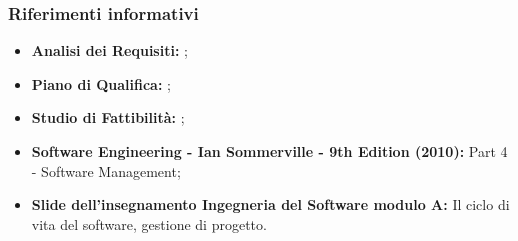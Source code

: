 		\subsubsection{Riferimenti informativi}
			\begin{itemize}
				\item \textbf{Analisi dei Requisiti:} ;
				\item \textbf{Piano di Qualifica:} ;
				\item \textbf{Studio di Fattibilità:} ;
				\item \textbf{Software Engineering - Ian Sommerville - 9th Edition (2010):} Part 4 - Software Management;
				\item \textbf{Slide dell’insegnamento Ingegneria del Software modulo A:} Il ciclo di vita del software, gestione di progetto.
			\end{itemize}